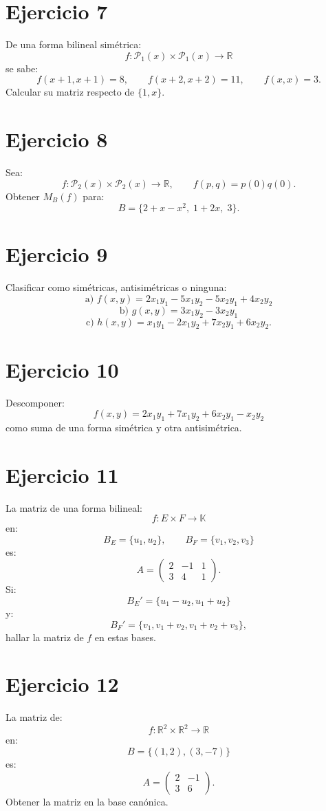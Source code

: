 \documentclass[11pt,a4paper]{article}
\newcommand{\R}{\mathbb{R}}
\newcommand{\K}{\mathbb{K}}
\begin{document}
\section{Ejercicio 7}
De una forma bilineal simétrica:
\[
f:\mathcal P_1(x)\times\mathcal P_1(x)\to\R
\]
se sabe:
\[
f(x+1,x+1)=8,\qquad
f(x+2,x+2)=11,\qquad
f(x,x)=3.
\]
Calcular su matriz respecto de $\{1,x\}$.

\section{Ejercicio 8}
Sea:
\[
f:\mathcal P_2(x)\times\mathcal P_2(x)\to\R,
\qquad
f(p,q)=p(0)q(0).
\]
Obtener $M_B(f)$ para:
\[
B=\{2+x-x^2,\;1+2x,\;3\}.
\]

\section{Ejercicio 9}
Clasificar como simétricas, antisimétricas o ninguna:
\[
\text{a) }f(x,y)=2x_1y_1-5x_1y_2-5x_2y_1+4x_2y_2
\]
\[
\text{b) }g(x,y)=3x_1y_2-3x_2y_1
\]
\[
\text{c) }h(x,y)=x_1y_1-2x_1y_2+7x_2y_1+6x_2y_2.
\]

\section{Ejercicio 10}
Descomponer:
\[
f(x,y)=2x_1y_1+7x_1y_2+6x_2y_1-x_2y_2
\]
como suma de una forma simétrica y otra antisimétrica.

\section{Ejercicio 11}
La matriz de una forma bilineal:
\[
f:E\times F\to\K
\]
en:
\[
B_E=\{u_1,u_2\},
\qquad
B_F=\{v_1,v_2,v_3\}
\]
es:
\[
A=
\begin{pmatrix}
2&-1&1\\
3&4&1
\end{pmatrix}.
\]
Si:
\[
B_E'=\{u_1-u_2,u_1+u_2\}
\]
y:
\[
B_F'=\{v_1,v_1+v_2,v_1+v_2+v_3\},
\]
hallar la matriz de $f$ en estas bases.

\section{Ejercicio 12}
La matriz de:
\[
f:\R^2\times\R^2\to\R
\]
en:
\[
B=\{(1,2),(3,-7)\}
\]
es:
\[
A=
\begin{pmatrix}
2&-1\\
3&6
\end{pmatrix}.
\]
Obtener la matriz en la base canónica.
\end{document}
